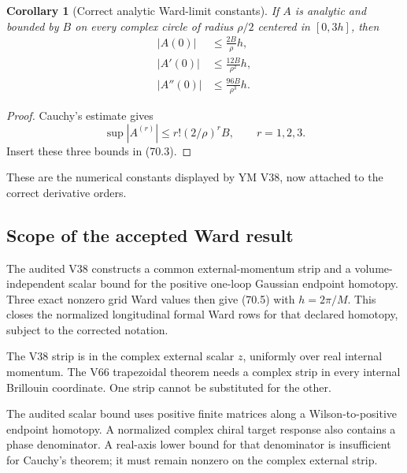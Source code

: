 \documentclass[11pt]{article}
\newtheorem{corollary}[theorem]{Corollary}
\begin{document}
\begin{corollary}[Correct analytic Ward-limit constants]
\label{cor:v11v70-cauchy}
If \(A\) is analytic and bounded by \(B\) on every complex circle of
radius \(\rho/2\) centered in \([0,3h]\), then
\[
\begin{split}
 |A(0)|&\le\frac{2B}{\rho}h,\\
 |A'(0)|&\le\frac{12B}{\rho^2}h,\\
 |A''(0)|&\le\frac{96B}{\rho^3}h.                            \tag{70.5}
\end{split}
\]
\end{corollary}

\begin{proof}
Cauchy's estimate gives
\[
                         \sup|A^{(r)}|
                    \le r!(2/\rho)^rB,\qquad r=1,2,3.
\]
Insert these three bounds in (70.3).
\end{proof}

These are the numerical constants displayed by YM V38, now attached
to the correct derivative orders.

\subsection{Scope of the accepted Ward result}

The audited V38 constructs a common external-momentum strip and a
volume-independent scalar bound for the positive one-loop Gaussian
endpoint homotopy.  Three exact nonzero grid Ward values then give
(70.5) with \(h=2\pi/M\).  This closes the normalized longitudinal
formal Ward rows for that declared homotopy, subject to the corrected
notation.

\begin{warning}
\label{warn:v11v70-strips}
The V38 strip is in the complex external scalar \(z\), uniformly over
real internal momentum.  The V66 trapezoidal theorem needs a complex
strip in every internal Brillouin coordinate.  One strip cannot be
substituted for the other.
\end{warning}

\begin{warning}
\label{warn:v11v70-target}
The audited scalar bound uses positive finite matrices along a
Wilson-to-positive endpoint homotopy.  A normalized complex chiral
target response also contains a phase denominator.  A real-axis lower
bound for that denominator is insufficient for Cauchy's theorem; it
must remain nonzero on the complex external strip.
\end{warning}
\end{document}
